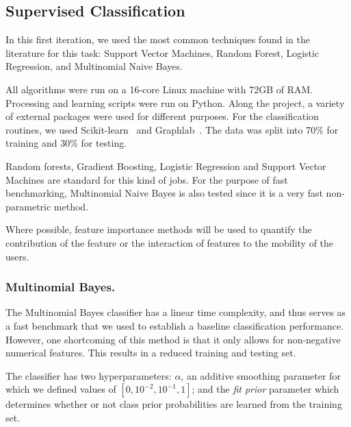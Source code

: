 \subsection{Supervised Classification}


In this first iteration, we used the most common techniques found in the literature for this task:
Support Vector Machines, Random Forest, Logistic Regression, and Multinomial Naive Bayes.

All algorithms were run on a 16-core Linux machine with 72GB of RAM. Processing and learning scripts were run on Python. %
Along the project, a variety of external packages were used for different purposes. For the classification routines, we used Scikit-learn~\cite{sklearn} and Graphlab~\cite{graphlab}.
The data was split into 70\% for training and 30\% for testing.



Random forests, Gradient Boosting, Logistic Regression and Support Vector Machines are standard for this kind of jobs. For the purpose of fast benchmarking, Multinomial Naive Bayes is also tested since it is a very fast non-parametric method. 

Where possible, feature importance methods will be used to quantify the contribution of the feature or the interaction of features to the mobility of the users.




\subsubsection{Multinomial Bayes.}

The Multinomial Bayes classifier has a linear time complexity, and thus serves as a fast benchmark that we used to establish a baseline classification performance. However, one shortcoming of this method is that it only allows for non-negative numerical features. This results in a reduced training and testing set.

The classifier has two hyperparameters: $\alpha$, an additive smoothing parameter for which we defined values of $[0,{10^{-2}},{10^{-1}},1]$; and the \textit{fit prior} parameter which determines whether or not class prior probabilities are learned from the training set. 

